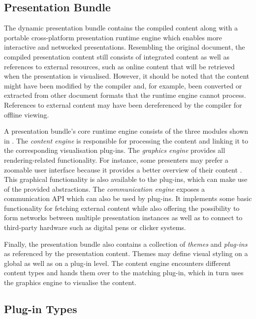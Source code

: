    \subsection{\mxp Presentation Bundle}

    The dynamic \mxp presentation bundle contains the compiled content along
    with a portable cross-platform presentation runtime engine which enables
    more interactive and networked presentations. Resembling the original
    document, the compiled presentation content still consists of integrated
    content as well as references to external resources, such as online content
    that will be retrieved when the presentation is visualised. However, it
    should be noted that the content might have been modified by the compiler
    and, for example, been converted or extracted from other document formats
    that the runtime engine cannot process. References to external content may
    have been dereferenced by the compiler for offline viewing.

    A presentation bundle's core runtime engine consists of the three modules
    shown in . The \emph{content engine} is responsible
    for processing the content and linking it to the corresponding
    visualisation plug-ins. The \emph{graphics engine} provides all
    rendering-related functionality. For instance, some presenters may prefer a
    zoomable user interface because it provides a better overview of their
    content \citep{reuss-1}. This graphical functionality is also available to
    the plug-ins, which can make use of the provided abstractions. The
    \emph{communication engine} exposes a communication API which can also be
    used by plug-ins. It implements some basic functionality for fetching
    external content while also offering the possibility to form networks
    between multiple \mxp presentation instances as well as to connect to
    third-party hardware such as digital pens or clicker systems.

    Finally, the presentation bundle also contains a collection of
    \emph{themes} and \emph{plug-ins} as referenced by the presentation
    content. Themes may define visual styling on a global as well as on a
    plug-in level. The content engine encounters different content types and
    hands them over to the matching plug-in, which in turn uses the graphics
    engine to visualise the content.

   \subsection{Plug-in Types}

